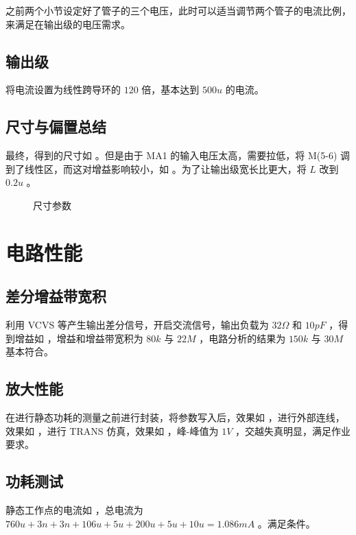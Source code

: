 \documentclass[lang=cn,11pt,a4paper,cite=authoryear]{elegantpaper}
\begin{document}
之前两个小节设定好了管子的三个电压，此时可以适当调节两个管子的电流比例，来满足在输出级的电压需求。

\subsection{输出级} 

将电流设置为线性跨导环的 \(120\) 倍，基本达到 \(500 u\) 的电流。

\subsection*{尺寸与偏置总结}

最终，得到的尺寸如  。但是由于 MA1 的输入电压太高，需要拉低，将 M(5-6) 调到了线性区，而这对增益影响较小，如  。为了让输出级宽长比更大，将 \(L\) 改到 \(0.2 u\) 。

\begin{figure}
    \caption{尺寸参数}\label{0304}
    \centering
\end{figure}


\section{电路性能}

\subsection{差分增益带宽积}

利用 VCVS 等产生输出差分信号，开启交流信号，输出负载为 \(32 \Omega\) 和 \(10 pF\) ，得到增益如  ，增益和增益带宽积为 \(80k\) 与 \(22 M\) ，电路分析的结果为 \(150 k\) 与 \(30 M\) 基本符合。


\subsection{放大性能} 

在进行静态功耗的测量之前进行封装，将参数写入后，效果如  ，进行外部连线，效果如  ，进行 TRANS 仿真，效果如  ，峰-峰值为 \(1 V\) ，交越失真明显，满足作业要求。




\subsection{功耗测试}

静态工作点的电流如  ，总电流为\(760u + 3n + 3n + 106u + 5u + 200u + 5u + 10u = 1.086 mA\) 。满足条件。

\end{document}
